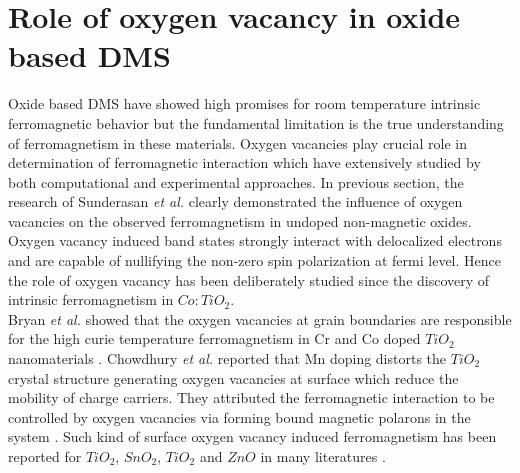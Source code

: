 \documentclass[main.tex]{subfiles}
\begin{document}
\section{Role of oxygen vacancy in oxide based DMS}

Oxide based DMS have showed high promises for room temperature intrinsic ferromagnetic behavior but the fundamental limitation is the true understanding of ferromagnetism in these materials. Oxygen vacancies play crucial role in determination of ferromagnetic interaction which have extensively studied by both computational and experimental approaches. In previous section, the research of Sunderasan \textit{et al.} clearly demonstrated the influence of oxygen vacancies on the observed ferromagnetism in undoped non-magnetic oxides. Oxygen vacancy induced band states strongly interact with delocalized electrons and are capable of nullifying the non-zero spin polarization at fermi level. Hence the role of oxygen vacancy has been deliberately studied since the discovery of intrinsic ferromagnetism in $Co:TiO_{2}$. \\

Bryan \textit{et al.} showed that the oxygen vacancies at grain boundaries are responsible for the high curie temperature ferromagnetism in Cr and Co doped $TiO_{2}$ nanomaterials \cite{bryan2005activation}. Chowdhury \textit{et al.} reported that Mn doping distorts the $TiO_{2}$ crystal structure generating oxygen vacancies at surface which reduce the mobility of charge carriers. They attributed the ferromagnetic interaction to be controlled by oxygen vacancies via forming bound magnetic polarons in the system \cite{choudhury2013oxygen}. Such kind of surface oxygen vacancy induced ferromagnetism has been reported for $TiO_{2}$, $SnO_{2}$, $TiO_{2}$ and $ZnO$ in many literatures \cite{santara2014oxygen, chen2010oxygen, chang2012oxygen, lee2002study, hong2005role, fernandes2009dilute}. 
\end{document}
